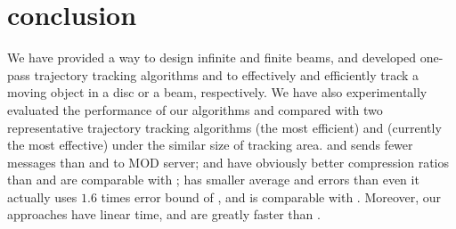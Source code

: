 
\section{conclusion}
\label{sec-conclusion}

We have provided a way to design infinite and finite beams, and developed one-pass trajectory tracking algorithms \citt and \bitt to effectively and efficiently track a moving object in a disc or a beam, respectively.
We have also experimentally evaluated the performance of our algorithms \citt and \bitt compared with two representative trajectory tracking algorithms \ldrh (the most efficient) and \grts (currently the most effective) under the similar size of tracking area. 
\citt and \bitt sends fewer messages than \grts and \ldrh to MOD server;
\citt and \bitt have obviously better compression ratios than \ldrh and are comparable with \grts;
\bitt has smaller average \ped and \sed errors than \grts even it actually uses $1.6$ times \sed error bound of \grts, and \citt is comparable with \grts.
Moreover, our approaches have linear time, and are greatly faster than \grts.
